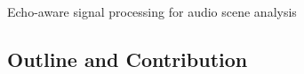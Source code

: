 \begin{frame}[t]{\alert{Echo-aware signal processing for audio scene analysis}}

\end{frame}

\subsection*{Outline and Contribution}

